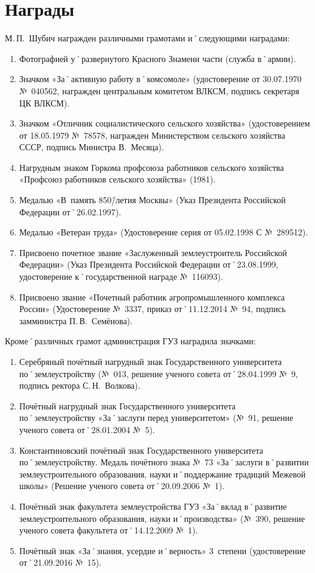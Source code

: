 ﻿\section{Награды}
\noindent М.\,П.~Шубич награжден различными грамотами и˚следующими наградами: 

\begin{enumerate}[nosep]
	\item Фотографией у˚развернутого Красного Знамени части (служба в˚армии).
	\item Значком «За˚активную работу в˚комсомоле» (удостоверение от 30.07.1970 №~040562, награжден центральным комитетом ВЛКСМ, подпись секретаря ЦК ВЛКСМ).
	\item Значком «Отличник социалистического сельского хозяйства» (удостоверением от 18.05.1979 №~78578, награжден Министерством сельского хозяйства СССР, подпись Министра В.~Месяца).
	\item Нагрудным знаком Горкома профсоюза работников сельского хозяйства «Профсоюз работников сельского хозяйства» (1981).
	\item Медалью «В~память 850\=/летия Москвы» (Указ Президента Российской Федерации от˚26.02.1997).
	\item Медалью «Ветеран труда» (Удостоверение серия от 05.02.1998 С №~289512).
	\item Присвоено почетное звание «Заслуженный землеустроитель Российской Федерации» (Указ Президента Российской Федерации от˚23.08.1999, удостоверение к˚государственной награде №~116093).
	\item Присвоено звание «Почетный работник агропромышленного комплекса России» (Удостоверение №~3337, приказ от˚11.12.2014 №~94, подпись замминистра П.\,В.~Семёнова).
\end{enumerate}

\noindent Кроме˚различных грамот администрация ГУЗ наградила значками:
\begin{enumerate}[nosep]
	\item Серебряный почётный нагрудный знак Государственного университета по˚землеустройству (№~013, решение ученого совета от˚28.04.1999 №~9, подпись ректора С.\,Н.~Волкова).

\pagebreak

	\item Почётный нагрудный знак Государственного университета по˚землеустройству «За˚заслуги перед университетом» (№~91, решение ученого совета от˚28.01.2004 №~5).
	\item Константиновский почётный знак Государственного университета по˚землеустройству. Медаль почётного знака №~73 «За˚заслуги в˚развитии землеустроительного образования, науки и˚поддержание традиций Межевой школы» (Решение ученого совета от˚20.09.2006 №~1).
	\item Почётный знак факультета землеустройства ГУЗ «За˚вклад в˚развитие землеустроительного образования, науки и˚производства» (№~390, решение ученого совета факультета от˚14.12.2009 №~1).
	\item Почётный знак «За˚знания, усердие и˚верность» 3~степени (удостоверение от˚21.09.2016 №~15). 
\end{enumerate}
